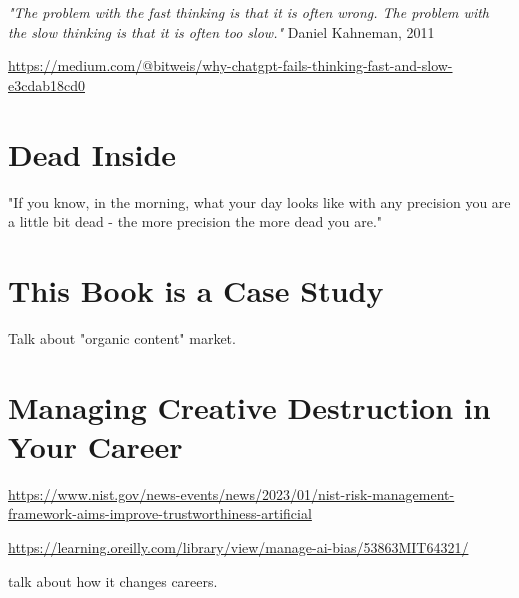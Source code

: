 \textit{"The problem with the fast thinking is that it is often wrong. The problem with the slow thinking is that it is often too slow."} Daniel Kahneman, 2011 \cite{Kahneman2011}

\url{https://medium.com/@bitweis/why-chatgpt-fails-thinking-fast-and-slow-e3cdab18cd0}

\section{Dead Inside}

"If you know, in the morning, what your day looks like with any precision you are a little bit dead - the more precision the more dead you are."

\section{This Book is a Case Study}

Talk about "organic content" market.

\section{Managing Creative Destruction in Your Career}

\url{https://www.nist.gov/news-events/news/2023/01/nist-risk-management-framework-aims-improve-trustworthiness-artificial}

\url{https://learning.oreilly.com/library/view/manage-ai-bias/53863MIT64321/}

talk about how it changes careers.
